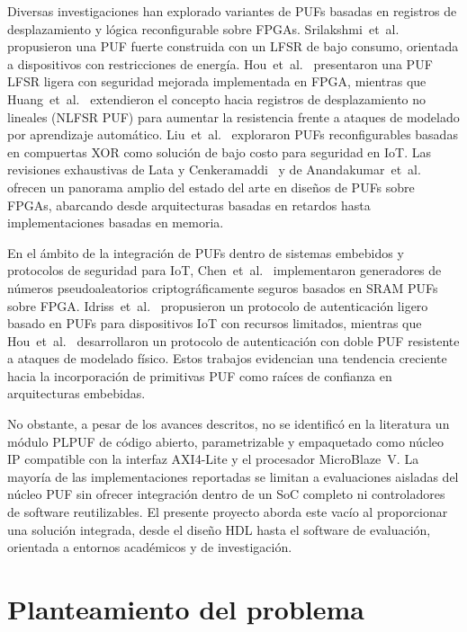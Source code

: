 Diversas investigaciones han explorado variantes de PUFs basadas en
registros de desplazamiento y lógica reconfigurable sobre FPGAs.
Srilakshmi~et~al.~\cite{srilakshmi_2023_puf_lfsr} propusieron una PUF fuerte
construida con un LFSR de bajo consumo, orientada a dispositivos con
restricciones de energía. Hou~et~al.~\cite{hou_2019_lightweight} presentaron
una PUF LFSR ligera con seguridad mejorada implementada en FPGA, mientras que
Huang~et~al.~\cite{huang_2024_nlfsr} extendieron el concepto hacia registros
de desplazamiento no lineales (NLFSR PUF) para aumentar la resistencia frente
a ataques de modelado por aprendizaje automático.
Liu~et~al.~\cite{liu_2019_xor} exploraron PUFs reconfigurables basadas en
compuertas XOR como solución de bajo costo para seguridad en IoT. Las
revisiones exhaustivas de Lata y
Cenkeramaddi~\cite{lata_2023_fpgapuf} y de Anandakumar~et~al.
\cite{anandakumar_2021_fpgapufs} ofrecen un panorama amplio del estado del
arte en diseños de PUFs sobre FPGAs, abarcando desde arquitecturas basadas en
retardos hasta implementaciones basadas en memoria.

En el ámbito de la integración de PUFs dentro de sistemas embebidos y
protocolos de seguridad para IoT, Chen~et~al.~\cite{chen_2016_fpga}
implementaron generadores de números pseudoaleatorios criptográficamente
seguros basados en SRAM PUFs sobre FPGA.
Idriss~et~al.~\cite{idriss_2021_lightweight} propusieron un protocolo de
autenticación ligero basado en PUFs para dispositivos IoT con recursos
limitados, mientras que Hou~et~al.~\cite{hou_2023_modeling} desarrollaron un
protocolo de autenticación con doble PUF resistente a ataques de modelado
físico. Estos trabajos evidencian una tendencia creciente hacia la
incorporación de primitivas PUF como raíces de confianza en arquitecturas
embebidas.

No obstante, a pesar de los avances descritos, no se identificó en la
literatura un módulo PLPUF de código abierto, parametrizable y empaquetado
como núcleo IP compatible con la interfaz AXI4-Lite y el procesador
MicroBlaze~V. La mayoría de las implementaciones reportadas se limitan a
evaluaciones aisladas del núcleo PUF sin ofrecer integración dentro de un SoC
completo ni controladores de software reutilizables. El presente proyecto
aborda este vacío al proporcionar una solución integrada, desde el diseño HDL
hasta el software de evaluación, orientada a entornos académicos y de
investigación.

\section{Planteamiento del problema}

